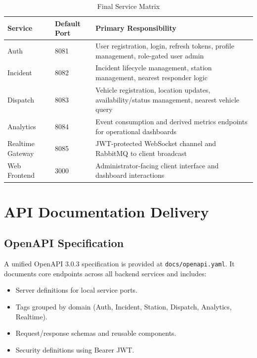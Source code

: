 \documentclass[12pt,a4paper]{report}
\begin{document}
\begin{table}[H]
\centering\small
\caption{Final Service Matrix}
\begin{tabular}{|l|l|p{8.1cm}|}
\hline
\textbf{Service} & \textbf{Default Port} & \textbf{Primary Responsibility} \\
\hline
Auth & 8081 & User registration, login, refresh tokens, profile management, role-gated user admin \\
\hline
Incident & 8082 & Incident lifecycle management, station management, nearest responder logic \\
\hline
Dispatch & 8083 & Vehicle registration, location updates, availability/status management, nearest vehicle query \\
\hline
Analytics & 8084 & Event consumption and derived metrics endpoints for operational dashboards \\
\hline
Realtime Gateway & 8085 & JWT-protected WebSocket channel and RabbitMQ to client broadcast \\
\hline
Web Frontend & 3000 & Administrator-facing client interface and dashboard interactions \\
\hline
\end{tabular}
\end{table}

\newpage

\chapter{API Documentation Delivery}

\section{OpenAPI Specification}

A unified OpenAPI 3.0.3 specification is provided at \texttt{docs/openapi.yaml}. It documents core endpoints across all backend services and includes:

\begin{itemize}
	\item Server definitions for local service ports.
	\item Tags grouped by domain (Auth, Incident, Station, Dispatch, Analytics, Realtime).
	\item Request/response schemas and reusable components.
	\item Security definitions using Bearer JWT.
\end{itemize}
\end{document}
